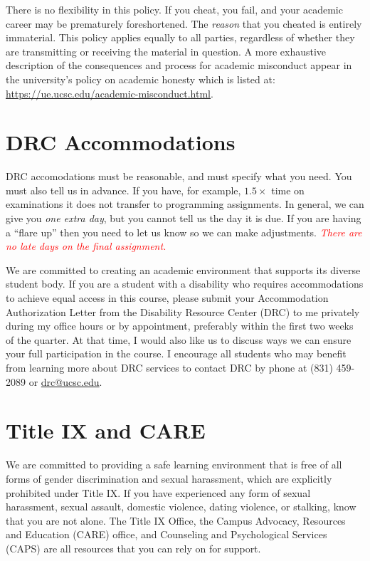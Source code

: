 \documentclass{article}
\begin{document}
There is no flexibility in this policy. If you cheat, you fail, and
your academic career may be prematurely foreshortened. The
\emph{reason} that you cheated is entirely immaterial. This policy
applies equally to all parties, regardless of whether they are
transmitting or receiving the material in question. A more exhaustive description
of the consequences and process for academic misconduct
appear in the university's policy on academic honesty which is listed at:
\url{https://ue.ucsc.edu/academic-misconduct.html}.

\section{DRC Accommodations}
DRC accomodations must be reasonable, and must specify what you
need. You must also tell us in advance. If you have, for example,
$1.5\times$ time on examinations it does not transfer to programming
assignments. In general, we can give you \emph{one extra day}, but
you cannot tell us the day it is due. If you are having a ``flare
up'' then you need to let us know so we can make adjustments.
\textcolor{red}{\emph{There are no late days on the final assignment.}}

We are committed to creating an academic environment that
supports its diverse student body. If you are a student with a
disability who requires accommodations to achieve equal access in
this course, please submit your Accommodation Authorization Letter
from the Disability Resource Center (DRC) to me privately during
my office hours or by appointment, preferably within the first two
weeks of the quarter. At that time, I would also like us to discuss
ways we can ensure your full participation in the course. I encourage
all students who may benefit from learning more about DRC services
to contact DRC by phone at (831) 459-2089 or \url{drc@ucsc.edu}.

\section{Title IX and CARE}
We are committed to providing a safe learning environment
that is free of all forms of gender discrimination and sexual
harassment, which are explicitly prohibited under Title IX. If you
have experienced any form of sexual harassment, sexual assault,
domestic violence, dating violence, or stalking, know that you are
not alone. The Title IX Office, the Campus Advocacy, Resources and
Education (CARE) office, and Counseling and Psychological Services
(CAPS) are all resources that you can rely on for support.
\end{document}
